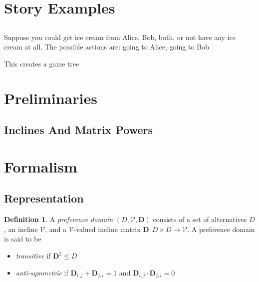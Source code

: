 \documentclass{article}
\theoremstyle{plain}
\theoremstyle{definition}
\newtheorem{defn}{Definition}[section]
\theoremstyle{remark}
\begin{document}
	\section{Story Examples}
	\subsection{}
	Suppose you could get ice cream from Alice, Bob, both, or not have any ice cream at all. The possible actions are: going to Alice, going to Bob
	
	This creates a game tree
	
	\clearpage
	\section{Preliminaries}
	\subsection{Inclines And Matrix Powers}
	
	
	
	\section{Formalism}
	\subsection{Representation}
	
	\begin{defn}
		A \emph{preference domain} $(D, \mathcal V, \mathbf D)$ consists of a set of alternatives $D$, an incline $\mathcal V$, and a $\mathcal V$-valued incline matrix $\mathbf D: D \times D \to \mathcal V$. A preference domain is said to be 
		\begin{itemize}
			\item \textit{transitive} if $\mathbf D^2 \leq D$
			\item \textit{anti-symmetric} if $\mathbf D_{i,j} + \mathbf D_{j,i} = 1$ and $\mathbf D_{i,j} \cdot \mathbf D_{j,i} = 0$
		\end{itemize}
	\end{defn}
		
	
\end{document}
